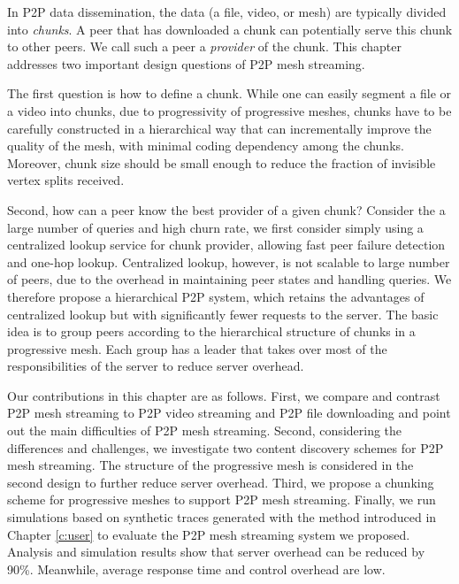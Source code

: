     In P2P data dissemination, the data (a file, video, or
    mesh) are typically divided into \textit{chunks}.  A
    peer that has downloaded a chunk can potentially serve
    this chunk to other peers.  We call such a peer a
    \textit{provider} of the chunk.  This chapter addresses
    two important design questions of P2P mesh streaming.

    The first question is how to define a chunk.  While one 
    can easily segment a 
    file or a video into chunks, due to progressivity
    of progressive meshes, chunks have to be carefully 
    constructed in a hierarchical way that can
    incrementally improve the quality of the mesh, with
    minimal coding dependency among the chunks.
    Moreover, chunk size should be small enough to 
    reduce the fraction of invisible vertex splits
    received. 

    Second, how can
    a peer know the best provider of a given chunk?   
    Consider the a large number of queries and high churn
    rate, we first consider simply using a 
    centralized lookup service for chunk provider,
    allowing fast peer failure detection and one-hop lookup.
    Centralized lookup, however, is not scalable to large
    number of peers, due to the overhead in maintaining
    peer states and handling queries.
    We therefore propose a hierarchical P2P
    system, which retains the advantages of centralized
    lookup but with significantly fewer 
    requests to the server.  The
    basic idea is to group peers according to the
    hierarchical structure of chunks in a progressive mesh.
    Each group has a leader that takes over most of the responsibilities of the server to
    reduce server overhead.
    
    Our contributions in this chapter are as follows.
    First, we compare and contrast P2P mesh streaming to P2P
    video streaming and P2P file downloading and point out
    the main difficulties of P2P mesh streaming.  Second, 
    considering the differences and challenges, 
    we investigate two content discovery schemes for P2P
    mesh streaming.  The structure of the progressive
    mesh is considered in the second design to further
    reduce server overhead.  Third, we propose a 
    chunking scheme for progressive meshes to support P2P mesh
    streaming.  Finally, we run simulations based on synthetic traces
    generated with the method introduced in Chapter \ref{c:user} 
    to evaluate the P2P mesh streaming system we proposed.  Analysis and
    simulation results show that server overhead can be
    reduced by 90\%. Meanwhile,  average response time and
    control overhead are low.

